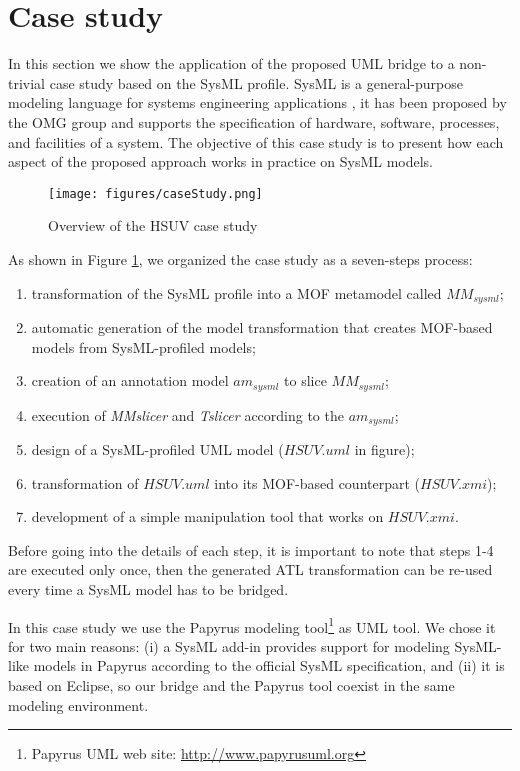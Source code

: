 \section{Case study}\label{sec:caseStudy}
In this section we show the application of the proposed UML bridge to a non-trivial case study based on the SysML profile.
SysML is a general-purpose modeling language for systems engineering applications \cite{sysml}, it has been proposed by the OMG group
and supports the specification of  hardware, software, processes, and facilities of a system.
The objective of this case study is to present how each aspect of the proposed approach works in practice on SysML models.

\begin{figure}[htbp]
	\centering
		\texttt{[image: figures/caseStudy.png]}
	\caption{Overview of the HSUV case study}
	\label{fig:caseStudy}
\end{figure}

As shown in Figure \ref{fig:caseStudy}, we organized the case study as a seven-steps process:
%
\begin{enumerate}
	\item transformation of the SysML profile into a MOF metamodel called $MM_{sysml}$;
	\item automatic generation of the model transformation that creates MOF-based models from SysML-profiled models;
	\item creation of an annotation model $am_{sysml}$ to slice $MM_{sysml}$;
	\item execution of \textit{MMslicer} and \textit{Tslicer} according to the $am_{sysml}$;
	\item design of a SysML-profiled UML model ($HSUV.uml$ in figure);
	\item transformation of $HSUV.uml$ into its MOF-based counterpart ($HSUV.xmi$);
	\item development of a simple manipulation tool that works on $HSUV.xmi$.
\end{enumerate}
%
Before going into the details of each step, it is important to note that steps 1-4 are executed only once, 
then the generated ATL transformation can be re-used every time a SysML model has to be bridged.


In this case study we use the Papyrus modeling tool\footnote{Papyrus UML web site: \small{\url{http://www.papyrusuml.org}}} as UML
tool. We chose it for two main reasons: (i) a SysML add-in provides support for modeling SysML-like models in Papyrus according to
the official SysML specification,
and (ii) it is based on Eclipse, so our bridge and the Papyrus tool coexist in the same modeling environment.

